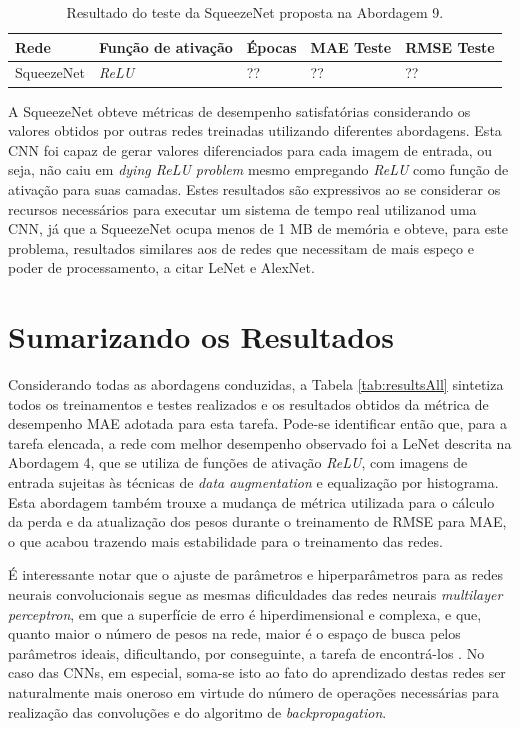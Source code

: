 	\begin{table}[!ht]
	\centering
	\caption{Resultado do teste da SqueezeNet proposta na Abordagem 9.}
	\label{tab:results-9}
		\begin{tabular}{l l l l l }
			\toprule
			Rede & Função de ativação & Épocas & MAE Teste & RMSE Teste \\
			\midrule
			SqueezeNet & \emph{ReLU} & ?? & ?? & ?? \\
			\bottomrule
		\end{tabular}
	\end{table}

	A SqueezeNet obteve métricas de desempenho satisfatórias considerando os valores obtidos por outras redes treinadas utilizando diferentes abordagens. Esta CNN foi capaz de gerar valores diferenciados para cada imagem de entrada, ou seja, não caiu em \emph{dying ReLU problem} mesmo empregando \emph{ReLU} como função de ativação para suas camadas. Estes resultados são expressivos ao se considerar os recursos necessários para executar um sistema de tempo real utilizanod uma CNN, já que a SqueezeNet ocupa menos de 1 MB de memória \cite{squeezenet} e obteve, para este problema, resultados similares aos de redes que necessitam de mais espeço e poder de processamento, a citar LeNet e AlexNet.

\section{Sumarizando os Resultados}

Considerando todas as abordagens conduzidas, a Tabela \ref{tab:resultsAll} sintetiza todos os treinamentos e testes realizados e os resultados obtidos da métrica de desempenho MAE adotada para esta tarefa. Pode-se identificar então que, para a tarefa elencada, a rede com melhor desempenho observado foi a LeNet descrita na Abordagem 4, que se utiliza de funções de ativação \emph{ReLU}, com imagens de entrada sujeitas às técnicas de \emph{data augmentation} e equalização por histograma. Esta abordagem também trouxe a mudança de métrica utilizada para o cálculo da perda e da atualização dos pesos durante o treinamento de RMSE para MAE, o que acabou trazendo mais estabilidade para o treinamento das redes.



É interessante notar que o ajuste de parâmetros e hiperparâmetros para as redes neurais convolucionais segue as mesmas dificuldades das redes neurais \emph{multilayer perceptron}, em que a superfície de erro é hiperdimensional e complexa, e que, quanto maior o número de pesos na rede, maior é o espaço de busca pelos parâmetros ideais, dificultando, por conseguinte, a tarefa de encontrá-los \cite{Teresa:Livro}. No caso das CNNs, em especial, soma-se isto ao fato do aprendizado destas redes ser naturalmente mais oneroso em virtude do número de operações necessárias para realização das convoluções e do algoritmo de \emph{backpropagation}.
